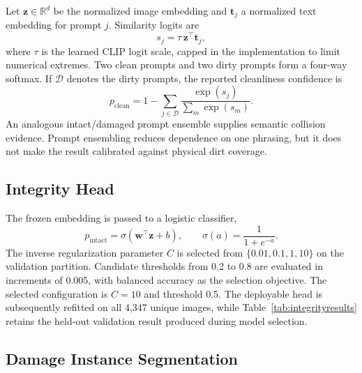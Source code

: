 \documentclass[conference]{IEEEtran}
\begin{document}
Let $\mathbf{z}\in\mathbb{R}^{d}$ be the normalized image embedding and $\mathbf{t}_j$ a normalized text embedding for prompt $j$. Similarity logits are
\begin{equation}
    s_j = \tau\,\mathbf{z}^{\top}\mathbf{t}_j,
    \label{eq:cliplogit}
\end{equation}
where $\tau$ is the learned CLIP logit scale, capped in the implementation to limit numerical extremes. Two clean prompts and two dirty prompts form a four-way softmax. If $\mathcal{D}$ denotes the dirty prompts, the reported cleanliness confidence is
\begin{equation}
    p_{\mathrm{clean}} = 1 - \sum_{j\in\mathcal{D}}
    \frac{\exp(s_j)}{\sum_{m}\exp(s_m)}.
    \label{eq:clean}
\end{equation}
An analogous intact/damaged prompt ensemble supplies semantic collision evidence. Prompt ensembling reduces dependence on one phrasing, but it does not make the result calibrated against physical dirt coverage.

\subsection{Integrity Head}

The frozen embedding is passed to a logistic classifier,
\begin{equation}
    p_{\mathrm{intact}} = \sigma(\mathbf{w}^{\top}\mathbf{z}+b),
    \qquad \sigma(a)=\frac{1}{1+e^{-a}}.
    \label{eq:logistic}
\end{equation}
The inverse regularization parameter $C$ is selected from $\{0.01,0.1,1,10\}$ on the validation partition. Candidate thresholds from 0.2 to 0.8 are evaluated in increments of 0.005, with balanced accuracy as the selection objective. The selected configuration is $C=10$ and threshold 0.5. The deployable head is subsequently refitted on all 4,347 unique images, while Table~\ref{tab:integrityresults} retains the held-out validation result produced during model selection.

\subsection{Damage Instance Segmentation}
\end{document}
